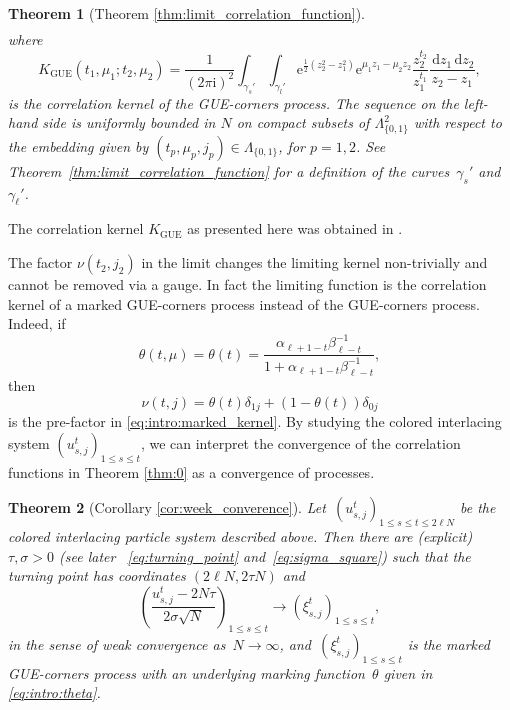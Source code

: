 \documentclass[11pt]{article}
\theoremstyle{plain}
\newtheorem{theorem}{Theorem}[section]
\theoremstyle{definition}
\numberwithin{equation}{section}
\renewcommand{\d}{\,\mathrm{d}}
\renewcommand{\i}{\mathrm{i}}
\newcommand{\e}{\mathrm{e}}
\begin{document}
\begin{theorem}[Theorem \ref{thm:limit_correlation_function}]
\begin{multline}
\end{multline}
%
%
where
\begin{equation}
K_{\operatorname{GUE}}(t_1,\mu_1;t_2,\mu_2)=\frac{1}{(2\pi\i)^2}\int_{\gamma_s'}\int_{\gamma_l'}\e^{\frac{1}{2}(z_2^2-z_1^2)}\e^{\mu_1 z_1-\mu_2z_2}\frac{z_2^{t_2}}{z_1^{t_1}}\frac{\d z_1\d z_2}{z_2-z_1},
\end{equation}
 is the correlation kernel of the GUE-corners process. The sequence on the left-hand side is uniformly bounded in $N$
 on compact subsets of 
$\Lambda_{\{0,1\}}^2$ with respect to the embedding given by $(t_p, \mu_p, j_p)\in \Lambda_{\{0,1\}}$, for $p=1,2$. See Theorem~\ref{thm:limit_correlation_function} for a definition of the curves~$\gamma_s'$ and~$\gamma_{\ell}'$.
 \end{theorem}

The correlation kernel $K_{\operatorname{GUE}}$ as presented here was obtained in \cite{JN06, OR06}. 

The factor $\nu(t_2, j_2)$ in the limit changes the limiting kernel non-trivially and cannot be removed via a gauge. In fact the limiting function is the correlation kernel of a %
marked GUE-corners process instead of the GUE-corners process. 
Indeed, if 
\begin{equation}\label{eq:intro:theta}
\theta(t,\mu)=\theta(t)=
\frac{\alpha_{\ell+1-t}\beta_{\ell-t}^{-1}}{1+\alpha_{\ell+1-t}\beta_{\ell-t}^{-1}},
\end{equation}
then 
\begin{equation}
\nu(t,j)=\theta(t)\delta_{1j}+(1-\theta(t))\delta_{0j}
\end{equation}
is the pre-factor in \eqref{eq:intro:marked_kernel}.
By studying the colored interlacing system $(u_{s,j}^t)_{1\leq s\leq t}$, we can interpret the convergence of the correlation functions in Theorem \ref{thm:0} as a convergence of processes. 

%

\begin{theorem}[Corollary \ref{cor:week_converence}]\label{thm:1}
Let~$(u_{s,j}^t)_{1\leq s\leq t\leq 2\ell N}$ be the colored interlacing particle system described above.
Then there are (explicit) $\tau, \sigma>0$ (see later ~\eqref{eq:turning_point} and~\eqref{eq:sigma_square}) 
%
%
 such that the turning point has coordinates $(2\ell N, 2\tau N)$ and 
\begin{equation}
\left(  \frac{u_{s,j}^{t}-2 N\tau }{2\sigma\sqrt{N}}\right)_{1\leq s\leq t}\to \left(\xi_{s,j}^t\right)_{1\leq s\leq t},
\end{equation}
in the sense of weak convergence as~$N\to \infty$, and~$(\xi_{s,j}^t)_{1\leq s\leq t}$ is the marked GUE-corners process with an underlying marking function~$\theta$ given in \eqref{eq:intro:theta}.
\end{theorem}
\end{document}
